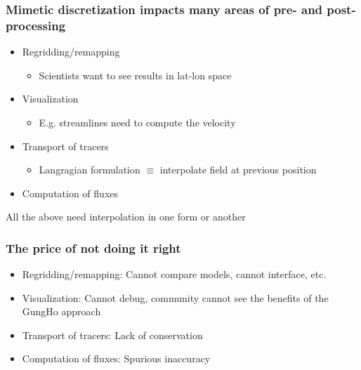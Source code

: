 \documentclass[aspectratio=169]{beamer}
\begin{document}
\begin{frame}[t]
  \frametitle{Mimetic discretization impacts many areas of pre- and post-processing}
    \begin{block}{}
      \begin{itemize}%
	  \item Regridding/remapping
      \begin{itemize}
        \item Scientists want to see results in lat-lon space
      \end{itemize}
      \item Visualization
      \begin{itemize}
        \item E.g. streamlines need to compute the velocity 
      \end{itemize}
      \item Transport of tracers
      \begin{itemize}
        \item Langragian formulation $\equiv$ interpolate field at previous position 
      \end{itemize}
      \item Computation of fluxes
      \end{itemize}
    All the above need {\color{red} interpolation} in one form  or another
  \end{block}
\end{frame}

\begin{frame}[t]
  \frametitle{The price of not doing it right}
    \begin{block}{}
      \begin{itemize}%
	  \item Regridding/remapping: {\color{red} Cannot compare models}, cannot interface, etc.
      \item Visualization: {\color{red} Cannot debug}, community cannot see the benefits of the GungHo approach
      \item Transport of tracers: Lack of {\color{red} conservation}
      \item Computation of fluxes: {\color{red} Spurious inaccuracy} 
      \end{itemize}
  \end{block}
\end{frame}
\end{document}
